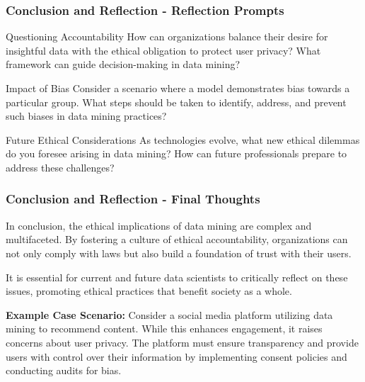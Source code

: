 \documentclass{beamer}
\begin{document}
\begin{frame}[fragile]
    \frametitle{Conclusion and Reflection - Reflection Prompts}
    \begin{block}{Questioning Accountability}
        How can organizations balance their desire for insightful data with the ethical obligation to protect user privacy? What framework can guide decision-making in data mining?
    \end{block}

    \begin{block}{Impact of Bias}
        Consider a scenario where a model demonstrates bias towards a particular group. What steps should be taken to identify, address, and prevent such biases in data mining practices?
    \end{block}

    \begin{block}{Future Ethical Considerations}
        As technologies evolve, what new ethical dilemmas do you foresee arising in data mining? How can future professionals prepare to address these challenges?
    \end{block}
\end{frame}

\begin{frame}[fragile]
    \frametitle{Conclusion and Reflection - Final Thoughts}
    In conclusion, the ethical implications of data mining are complex and multifaceted. By fostering a culture of ethical accountability, organizations can not only comply with laws but also build a foundation of trust with their users. 

    It is essential for current and future data scientists to critically reflect on these issues, promoting ethical practices that benefit society as a whole.
    
    \textbf{Example Case Scenario:} 
    Consider a social media platform utilizing data mining to recommend content. While this enhances engagement, it raises concerns about user privacy. The platform must ensure transparency and provide users with control over their information by implementing consent policies and conducting audits for bias.
\end{frame}
\end{document}
